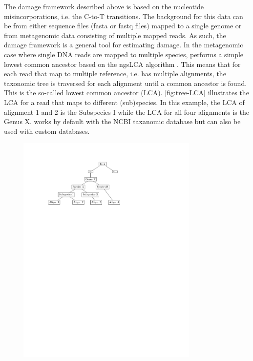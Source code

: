 The damage framework described above is based on the nucleotide misincorporations, i.e. the C-to-T transitions. The background for this data can be from either sequence files (fasta or fastq files) mapped to a single genome or from metagenomic data consisting of multiple mapped reads. As such, the damage framework is a general tool for estimating damage.
In the metagenomic case where single DNA reads are mapped to multiple species, \metaDMG performs a simple lowest common ancestor based on the ngsLCA algorithm \autocite{wangNgsLCAToolkitFasta}. This means that for each read that map to multiple reference, i.e. has multiple alignments, the taxonomic tree is traversed for each alignment until a common ancestor is found. This is the so-called lowest common ancestor (LCA). \autoref{fig:tree-LCA} illustrates the LCA for a read that maps to different (sub)species. In this example, the LCA of alignment 1 and 2 is the Subspecies I while the LCA for all four alignments is the Genus X. \metaDMG works by default with the NCBI taxanomic database but can also be used with custom databases.

\begin{figure}[htbp]
    \centering
    \includegraphics[trim={3cm 19.5cm 8.5cm 2.3cm}, clip, width=0.8\textwidth]{figures/tree.pdf}
\end{figure}

